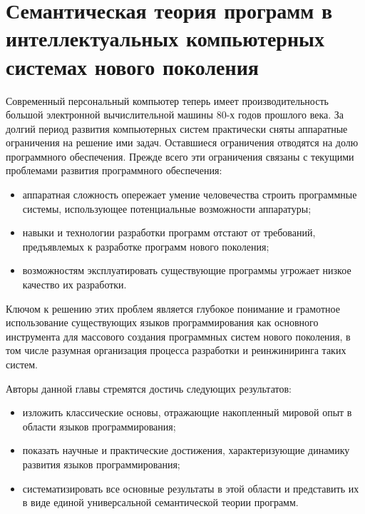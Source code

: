 \chapter{Семантическая теория программ в интеллектуальных компьютерных системах нового поколения}
\label{chapter_programs}

\abstract{}

Современный персональный компьютер теперь имеет производительность большой электронной вычислительной машины 80-х годов
прошлого века. За долгий период развития компьютерных систем практически сняты аппаратные ограничения на решение ими
задач. Оставшиеся ограничения отводятся на долю программного обеспечения.
Прежде всего эти ограничения связаны с текущими проблемами развития программного обеспечения:
\begin{itemize}
    \item аппаратная сложность опережает умение человечества строить программные системы, использующее потенциальные
    возможности аппаратуры;
    \item навыки и технологии разработки программ отстают от требований, предъявлемых к разработке программ нового
    поколения;
    \item возможностям эксплуатировать существующие программы угрожает низкое качество их разработки.
\end{itemize}
Ключом к решению этих проблем является глубокое понимание и грамотное использование существующих языков программирования 
как основного инструмента для массового создания программных систем нового поколения, в том числе разумная организация 
процесса разработки и реинжиниринга таких систем.

Авторы данной главы стремятся достичь следующих результатов:
\begin{itemize}
    \item изложить классические основы, отражающие накопленный мировой опыт в области языков программирования;
    \item показать научные и практические достижения, характеризующие динамику развития языков программирования;
    \item систематизировать все основные результаты в этой области и представить их в виде единой универсальной
    семантической теории программ.
\end{itemize}

